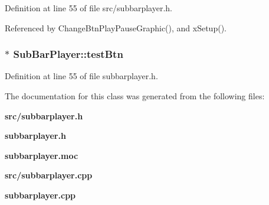 Definition at line 55 of file src/subbarplayer.h.

Referenced by Change\-Btn\-Play\-Pause\-Graphic(), and x\-Setup().
\subsubsection{ $\ast$ {\bf Sub\-Bar\-Player::test\-Btn}}\label{classSubBarPlayer_SubBarPlayero9}




Definition at line 55 of file subbarplayer.h.

The documentation for this class was generated from the following files:\begin{CompactItemize}
\item 
{\bf src/subbarplayer.h}\item 
{\bf subbarplayer.h}\item 
{\bf subbarplayer.moc}\item 
{\bf src/subbarplayer.cpp}\item 
{\bf subbarplayer.cpp}\end{CompactItemize}
